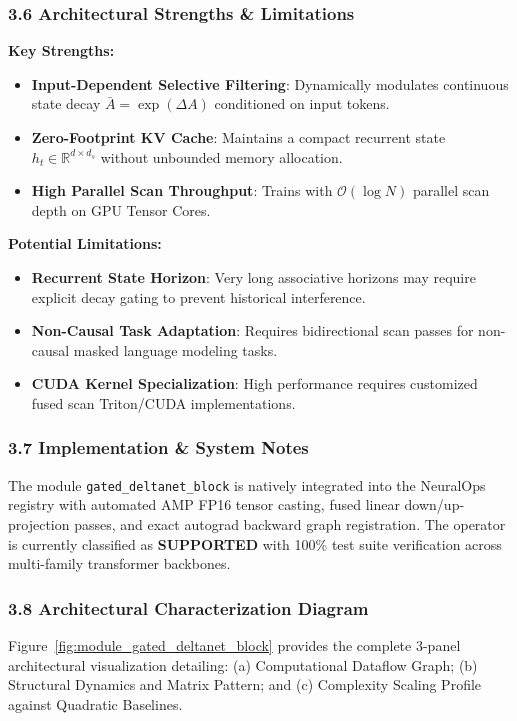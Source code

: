 \subsubsection*{3.6 Architectural Strengths \& Limitations}
\textbf{Key Strengths:}
\begin{itemize}
    \item \textbf{Input-Dependent Selective Filtering}: Dynamically modulates continuous state decay $\bar{A} = \exp(\Delta A)$ conditioned on input tokens.
    \item \textbf{Zero-Footprint KV Cache}: Maintains a compact recurrent state $h_t \in \mathbb{R}^{d \times d_s}$ without unbounded memory allocation.
    \item \textbf{High Parallel Scan Throughput}: Trains with $\mathcal{O}(\log N)$ parallel scan depth on GPU Tensor Cores.
\end{itemize}

\textbf{Potential Limitations:}
\begin{itemize}
    \item \textbf{Recurrent State Horizon}: Very long associative horizons may require explicit decay gating to prevent historical interference.
    \item \textbf{Non-Causal Task Adaptation}: Requires bidirectional scan passes for non-causal masked language modeling tasks.
    \item \textbf{CUDA Kernel Specialization}: High performance requires customized fused scan Triton/CUDA implementations.
\end{itemize}

\subsubsection*{3.7 Implementation \& System Notes}
The module \texttt{gated\_deltanet\_block} is natively integrated into the NeuralOps registry with automated AMP FP16 tensor casting, fused linear down/up-projection passes, and exact autograd backward graph registration. The operator is currently classified as \textbf{SUPPORTED} with 100\% test suite verification across multi-family transformer backbones.

\subsubsection*{3.8 Architectural Characterization Diagram}
Figure~\ref{fig:module_gated_deltanet_block} provides the complete 3-panel architectural visualization detailing: (a) Computational Dataflow Graph; (b) Structural Dynamics and Matrix Pattern; and (c) Complexity Scaling Profile against Quadratic Baselines.

